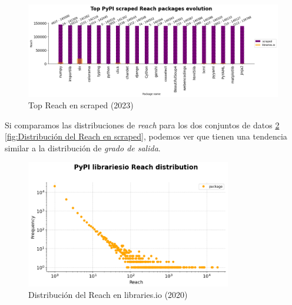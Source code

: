 \begin{figure}[ht!]
    \begin{center}
        \includegraphics[width=1\textwidth]{img/pypi/top_scraped_reach_evolution.png}
        \caption{Top Reach en scraped (2023)}
    \end{center}
    \label{fig:Top Reach en scraped}
\end{figure}


Si comparamos las distribuciones de \textit{reach} para los dos conjuntos de datos
\ref{fig:Distribución del Reach en libraries.io} \ref{fig:Distribución del Reach en scraped},
podemos ver que tienen una tendencia similar a la distribución de \textit{grado de salida}.

\begin{figure}[ht!]
    \begin{center}
        \includegraphics[width=0.8\textwidth]{img/pypi/librariesio_reach_distribution.png}
        \caption{Distribución del Reach en libraries.io (2020)}
    \end{center}
    \label{fig:Distribución del Reach en libraries.io}
\end{figure}

